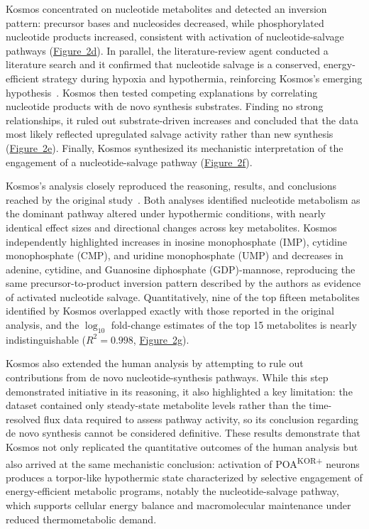 \documentclass{article}
\begin{document}
Kosmos concentrated on nucleotide metabolites and detected an inversion pattern: precursor bases and nucleosides decreased, while phosphorylated nucleotide products increased, consistent with activation of nucleotide-salvage pathways (\hyperref[fig:fig2]{Figure~2d}). In parallel, the literature-review agent conducted a literature search and it confirmed that nucleotide salvage is a conserved, energy-efficient strategy during hypoxia and hypothermia, reinforcing Kosmos’s emerging hypothesis~\cite{ohler_pyrimidine_2019, thauerer_purine_2012, shen_inosine_2005, benowitz_inosine_1999}. Kosmos then tested competing explanations by correlating nucleotide products with de novo synthesis substrates. Finding no strong relationships, it ruled out substrate-driven increases and concluded that the data most likely reflected upregulated salvage activity rather than new synthesis (\hyperref[fig:fig2]{Figure~2e}). Finally, Kosmos synthesized its mechanistic interpretation of the engagement of a nucleotide-salvage pathway (\hyperref[fig:fig2]{Figure~2f}).

Kosmos’s analysis closely reproduced the reasoning, results, and conclusions reached by the original study~\cite{kamal_preoptic_2025}. Both analyses identified nucleotide metabolism as the dominant pathway altered under hypothermic conditions, with nearly identical effect sizes and directional changes across key metabolites. Kosmos independently highlighted increases in inosine monophosphate (IMP), cytidine monophosphate (CMP), and uridine monophosphate (UMP) and decreases in adenine, cytidine, and Guanosine diphosphate (GDP)-mannose, reproducing the same precursor-to-product inversion pattern described by the authors as evidence of activated nucleotide salvage. Quantitatively, nine of the top fifteen metabolites identified by Kosmos overlapped exactly with those reported in the original analysis, and the $\log_{10}$ fold-change estimates of the top 15 metabolites is nearly indistinguishable ($R^2 = 0.998$, \hyperref[fig:fig2]{Figure~2g}).

Kosmos also extended the human analysis by attempting to rule out contributions from de novo nucleotide-synthesis pathways. While this step demonstrated initiative in its reasoning, it also highlighted a key limitation: the dataset contained only steady-state metabolite levels rather than the time-resolved flux data required to assess pathway activity, so its conclusion regarding de novo synthesis cannot be considered definitive. These results demonstrate that Kosmos not only replicated the quantitative outcomes of the human analysis but also arrived at the same mechanistic conclusion: activation of POA\textsuperscript{KOR+} neurons produces a torpor-like hypothermic state characterized by selective engagement of energy-efficient metabolic programs, notably the nucleotide-salvage pathway, which supports cellular energy balance and macromolecular maintenance under reduced thermometabolic demand.
\end{document}
